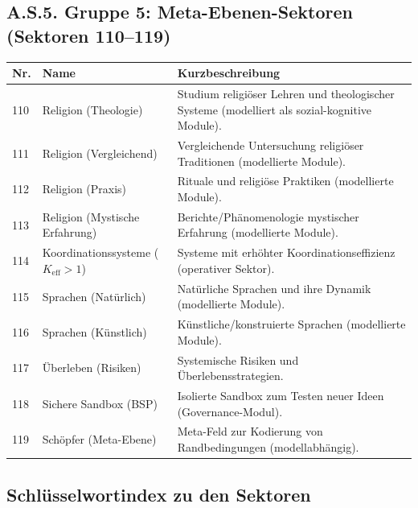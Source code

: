 \documentclass[13pt,a4paper]{article}
\newcommand{\Keff}{K_{\mathrm{eff}}}
\begin{document}
	\subsection*{A.S.5. Gruppe 5: Meta-Ebenen-Sektoren (Sektoren 110--119)}
	
	\begin{longtable}{|p{0.9cm}|p{6.0cm}|p{8.6cm}|}
		\hline
		\textbf{Nr.} & \textbf{Name} & \textbf{Kurzbeschreibung} \\
		\hline
		\endhead
		110 & Religion (Theologie) & Studium religiöser Lehren und theologischer Systeme (modelliert als sozial-kognitive Module). \\
		\hline
		111 & Religion (Vergleichend) & Vergleichende Untersuchung religiöser Traditionen (modellierte Module). \\
		\hline
		112 & Religion (Praxis) & Rituale und religiöse Praktiken (modellierte Module). \\
		\hline
		113 & Religion (Mystische Erfahrung) & Berichte/Phänomenologie mystischer Erfahrung (modellierte Module). \\
		\hline
		114 & Koordinationssysteme ($\Keff>1$) & Systeme mit erhöhter Koordinationseffizienz (operativer Sektor). \\
		\hline
		115 & Sprachen (Natürlich) & Natürliche Sprachen und ihre Dynamik (modellierte Module). \\
		\hline
		116 & Sprachen (Künstlich) & Künstliche/konstruierte Sprachen (modellierte Module). \\
		\hline
		117 & Überleben (Risiken) & Systemische Risiken und Überlebensstrategien. \\
		\hline
		118 & Sichere Sandbox (BSP) & Isolierte Sandbox zum Testen neuer Ideen (Governance-Modul). \\
		\hline
		119 & Schöpfer (Meta-Ebene) & Meta-Feld zur Kodierung von Randbedingungen (modellabhängig). \\
		\hline
	\end{longtable}
	
	\subsection*{Schlüsselwortindex zu den Sektoren}
	
\end{document}
